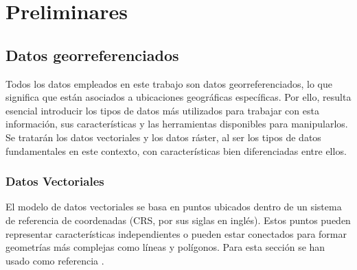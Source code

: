 \documentclass[12pt,a4paper,]{book}
\title{}
\author{Nombre Completo Autor}
\date{18/11/2021}
\def\ifdoblecara{} %
\def\ifprincipal{} %
\let\ifprincipal\undefined %
\numberwithin{dummy}{section}
\theoremstyle{ocrenumbox}
\theoremstyle{blacknumex}
\theoremstyle{blacknumbox}
\theoremstyle{ocrenum}
\theoremstyle{ocrenum}
\begin{document}




\raggedbottom

\ifdefined\ifprincipal
\else
\setlength{\parindent}{1em}
\pagestyle{fancy}
\setcounter{tocdepth}{4}
\tableofcontents

\fi

\ifdefined\ifdoblecara
\fancyhead{}{}
\fancyhead[LE,RO]{\scriptsize\rightmark}
\fancyfoot[LO,RE]{\scriptsize\slshape \leftmark}
\fancyfoot[C]{}
\fancyfoot[LE,RO]{\footnotesize\thepage}
\else
\fancyhead{}{}
\fancyhead[RO]{\scriptsize\rightmark}
\fancyfoot[LO]{\scriptsize\slshape \leftmark}
\fancyfoot[C]{}
\fancyfoot[RO]{\footnotesize\thepage}
\fi

\renewcommand{\headrulewidth}{0.4pt}
\renewcommand{\footrulewidth}{0.4pt}

\hypertarget{preliminares}{%
\chapter{Preliminares}\label{preliminares}}

\hypertarget{datos-georreferenciados}{%
\section{Datos georreferenciados}\label{datos-georreferenciados}}

Todos los datos empleados en este trabajo son datos georreferenciados,
lo que significa que están asociados a ubicaciones geográficas
específicas. Por ello, resulta esencial introducir los tipos de datos
más utilizados para trabajar con esta información, sus características y
las herramientas disponibles para manipularlos. Se tratarán los datos
vectoriales y los datos ráster, al ser los tipos de datos fundamentales
en este contexto, con características bien diferenciadas entre ellos.

\hypertarget{datos-vectoriales}{%
\subsection{Datos Vectoriales}\label{datos-vectoriales}}

El modelo de datos vectoriales se basa en puntos ubicados dentro de un
sistema de referencia de coordenadas (CRS, por sus siglas en inglés).
Estos puntos pueden representar características independientes o pueden
estar conectados para formar geometrías más complejas como líneas y
polígonos. Para esta sección se han usado como referencia
\citet{lovelace_geocomputation_2019}.
\end{document}
